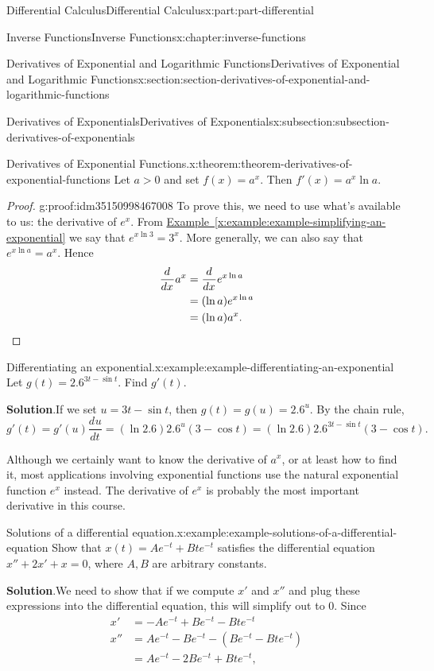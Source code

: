 \documentclass[twoside,10pt,]{tufte-book}
\newcommand{\blocktitlefont}{\relax}
\newcommand{\xreffont}{\relax}
\numberwithin{equation}{part}
\newcommand{\qedhere}{\relax}
\newcommand{\dv}[3][]{\dfrac{d^{#1} #2}{d #3^{#1}}}
\begin{document}
\begin{partptx}{Differential Calculus}{}{Differential Calculus}{}{}{x:part:part-differential}
\begin{chapterptx}{Inverse Functions}{}{Inverse Functions}{}{}{x:chapter:inverse-functions}
\begin{sectionptx}{Derivatives of Exponential and Logarithmic Functions}{}{Derivatives of Exponential and Logarithmic Functions}{}{}{x:section:section-derivatives-of-exponential-and-logarithmic-functions}
\begin{subsectionptx}{Derivatives of Exponentials}{}{Derivatives of Exponentials}{}{}{x:subsection:subsection-derivatives-of-exponentials}
\begin{theorem}{Derivatives of Exponential Functions.}{}{x:theorem:theorem-derivatives-of-exponential-functions}
%
Let \(a > 0\) and set \(f(x) = a^{x}\). Then \(f'(x) = a^{x}\ln a\).%
\end{theorem}
\begin{proof}{}{g:proof:idm35150998467008}
To prove this, we need to use what's available to us: the derivative of \(e^{x}\). From \hyperref[x:example:example-simplifying-an-exponential]{Example~{\xreffont\ref{x:example:example-simplifying-an-exponential}}} we say that \(e^{x\ln 3} = 3^{x}\). More generally, we can also say that \(e^{x\ln a} = a^{x}\). Hence%
\begin{align*}
\dv{}{x}a^{x} & = \dv{}{x}e^{x\ln a} \\
& = (\ln a)e^{x\ln a} \\
& = (\ln a)a^{x}. \qedhere
\end{align*}
%
\end{proof}
\begin{example}{Differentiating an exponential.}{x:example:example-differentiating-an-exponential}%
Let \(g(t) = 2.6^{3t - \sin t}\). Find \(g'(t)\).%
\par\smallskip%
\noindent\textbf{\blocktitlefont Solution}.\hypertarget{g:solution:idm35150998514624}{}\quad{}If we set \(u = 3t - \sin t\), then \(g(t) = g(u) = 2.6^{u}\). By the chain rule, \(g'(t) = g'(u)\dv{u}{t} = (\ln2.6)2.6^{u}(3-\cos t) = (\ln2.6)2.6^{3t-\sin t}(3-\cos t).\)%
\end{example}
Although we certainly want to know the derivative of \(a^{x}\), or at least how to find it, most applications involving exponential functions use the natural exponential function \(e^{x}\) instead. The derivative of \(e^{x}\) is probably the most important derivative in this course.%
\begin{example}{Solutions of a differential equation.}{x:example:example-solutions-of-a-differential-equation}%
Show that \(x(t) = Ae^{-t} + Bte^{-t}\) satisfies the differential equation \(x'' + 2x' + x = 0\), where \(A,B\) are arbitrary constants.%
\par\smallskip%
\noindent\textbf{\blocktitlefont Solution}.\hypertarget{g:solution:idm35150998509376}{}\quad{}We need to show that if we compute \(x'\) and \(x''\) and plug these expressions into the differential equation, this will simplify out to \(0\). Since%
\begin{align*}
x' & = -Ae^{-t} +Be^{-t} - Bte^{-t} \\
x'' & = Ae^{-t} - Be^{-t} - (Be^{-t} - Bte^{-t}) \\
& = Ae^{-t} - 2Be^{-t} + Bte^{-t}, 

\end{align*}
\end{example}
\end{subsectionptx}
\end{sectionptx}
\end{chapterptx}
\end{partptx}
\end{document}
